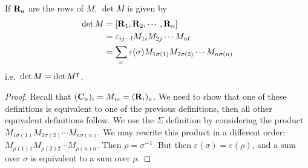 \begin{proposition}
	If \(\vb R_a\) are the rows of \(M\), \(\det M\) is given by
	\begin{align*}
		\det M
		 & = [\vb R_1, \vb R_2, \cdots, \vb R_n]                                                \\
		 & = \varepsilon_{ij\cdots l}M_{1i}M_{2j} \cdots M_{nl}                                 \\
		 & = \sum_\sigma \varepsilon(\sigma) M_{1\sigma(1)}M_{2\sigma(2)} \cdots M_{n\sigma(n)}
	\end{align*}
	i.e.\ \(\det M = \det M^\intercal\).
\end{proposition}
\begin{proof}
	Recall that \((\vb C_a)_i = M_{ia} = (\vb R_i)_a\).
	We need to show that one of these definitions is equivalent to one of the previous definitions, then all other equivalent definitions follow.
	We use the \(\Sigma\) definition by considering the product \(M_{1\sigma(1)}M_{2\sigma(2)} \cdots M_{n\sigma(n)}\).
	We may rewrite this product in a different order: \(M_{\rho(1)1}M_{\rho(2)2} \cdots M_{\rho(n)n}\).
	Then \(\rho = \sigma^{-1}\).
	But then \(\varepsilon(\sigma) = \varepsilon(\rho)\), and a sum over \(\sigma\) is equivalent to a sum over \(\rho\).
\end{proof}

